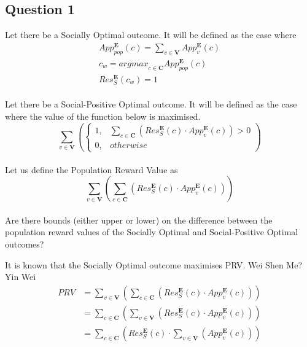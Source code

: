 \documentclass{article}
\begin{document}
\subsection{Question 1}

Let there be a Socially Optimal outcome. It will be defined as the case where
\begin{gather}
App^{\boldsymbol{E}}_{pop}(c) = \sum^{}_{v \in \boldsymbol{V}}{App^{\boldsymbol{E}}_{v}(c)}\\
c_{w} = {argmax}_{c \in \boldsymbol{C}} App^{\boldsymbol{E}}_{pop}(c)\\
Res^{\boldsymbol{E}}_{S}(c_{w}) = 1
\end{gather}\\

Let there be a Social-Positive Optimal outcome. It will be defined as the case where the value of the function below is maximised.
\begin{equation}
\sum^{}_{v \in \boldsymbol{V}}{\left(
\begin{cases}
1, & \sum^{}_{c \in \boldsymbol{C}}{(Res^{\boldsymbol{E}}_{S}(c) \cdot App^{\boldsymbol{E}}_{v}(c))} > 0\\
0, & {otherwise}
\end{cases}
\right)}
\end{equation}\\

Let us define the Population Reward Value as
\begin{equation}
\sum^{}_{v \in \boldsymbol{V}}{\left(
\sum^{}_{c \in \boldsymbol{C}}{\left(
Res^{\boldsymbol{E}}_{S}(c) \cdot App^{\boldsymbol{E}}_{v}(c)
\right)}
\right)}
\end{equation}\\

Are there bounds (either upper or lower) on the difference between the population reward values of the Socially Optimal and Social-Positive Optimal outcomes?

It is known that the Socially Optimal outcome maximises PRV. Wei Shen Me? Yin Wei
\begin{equation}
\begin{aligned}
PRV
&= \sum^{}_{v \in \boldsymbol{V}}{\left(\sum^{}_{c \in \boldsymbol{C}}{\left(Res^{\boldsymbol{E}}_{S}(c) \cdot App^{\boldsymbol{E}}_{v}(c)\right)}\right)}\\
&= \sum^{}_{c \in \boldsymbol{C}}{\left(\sum^{}_{v \in \boldsymbol{V}}{\left(Res^{\boldsymbol{E}}_{S}(c) \cdot App^{\boldsymbol{E}}_{v}(c)\right)}\right)}\\
&= \sum^{}_{c \in \boldsymbol{C}}{\left(Res^{\boldsymbol{E}}_{S}(c) \cdot \sum^{}_{v \in \boldsymbol{V}}{\left(App^{\boldsymbol{E}}_{v}(c)\right)}\right)}
\end{aligned}
\end{equation}
\end{document}
